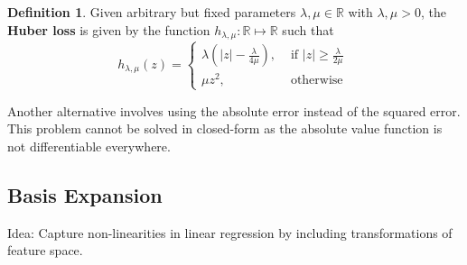 \documentclass[11pt, %
	oneside, %
	english, %
	onehalfspacing, %
	parskip, %
	]{article} %
\theoremstyle{definition}
\newtheorem{definition}{Definition}
\begin{document}
\begin{definition}
	Given arbitrary but fixed parameters $\lambda, \mu \in \mathbb{R}$ with $\lambda, \mu>0$, the \textbf{Huber loss} is given by the function $h_{\lambda, \mu}: \mathbb{R} \mapsto \mathbb{R}$ such that
$$
h_{\lambda, \mu}(z)= \begin{cases}\lambda\left(|z|-\frac{\lambda}{4 \mu}\right), & \text { if }|z| \geq \frac{\lambda}{2 \mu} \\ \mu z^2, & \text { otherwise }\end{cases}
$$
\end{definition}

Another alternative involves using the absolute error instead of the squared error. This problem cannot be solved in closed-form as the absolute value function is not differentiable everywhere.


\subsection{Basis Expansion}

Idea: Capture non-linearities in linear regression by including transformations of feature space.
\end{document}
